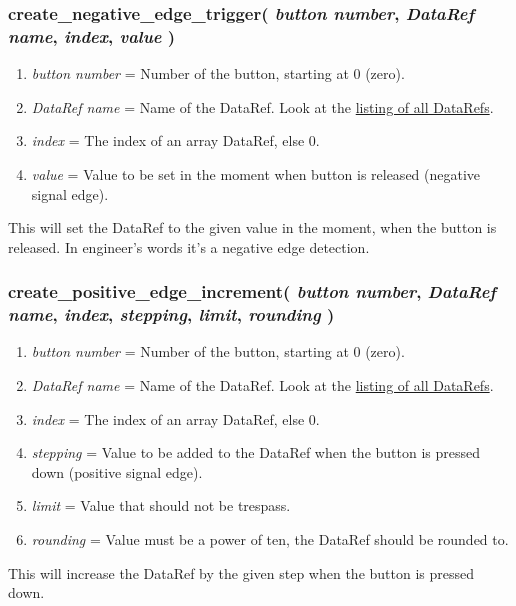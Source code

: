 \documentclass[11pt,parskip=half,a4paper]{scrartcl}
\begin{document}
\subsubsection{create\_negative\_edge\_trigger( \emph{button number}, \emph{DataRef name}, \emph{index}, \emph{value} )}

\begin{enumerate}
	\item \emph{button number} = Number of the button, starting at 0 (zero).
	\item \emph{DataRef name} = Name of the DataRef. Look at the \href{http://www.xsquawkbox.net/xpsdk/docs/DataRefs.html}{listing of all DataRefs}.
	\item \emph{index} = The index of an array DataRef, else 0.
	\item \emph{value} = Value to be set in the moment when button is released (negative signal edge).
\end{enumerate}

This will set the DataRef to the given value in the moment, when the button is released. In engineer's words it's a negative edge detection.


\subsubsection{create\_positive\_edge\_increment( \emph{button number}, \emph{DataRef name}, \emph{index}, \emph{stepping}, \emph{limit}, \emph{rounding} )}

\begin{enumerate}
	\item \emph{button number} = Number of the button, starting at 0 (zero).
	\item \emph{DataRef name} = Name of the DataRef. Look at the \href{http://www.xsquawkbox.net/xpsdk/docs/DataRefs.html}{listing of all DataRefs}.
	\item \emph{index} = The index of an array DataRef, else 0.
	\item \emph{stepping} = Value to be added to the DataRef when the button is pressed down (positive signal edge).
	\item \emph{limit} = Value that should not be trespass.
	\item \emph{rounding} = Value must be a power of ten, the DataRef should be rounded to.
\end{enumerate}

This will increase the DataRef by the given step when the button is pressed down.
\end{document}
